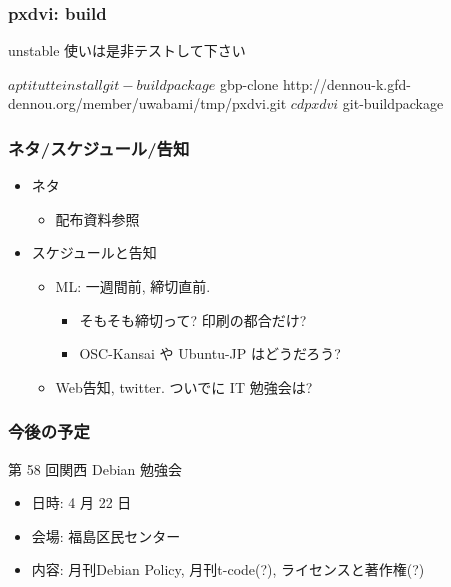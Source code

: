 \documentclass[cjk,dvipdfmx,12pt,%
hyperref={bookmarks=true,bookmarksnumbered=true,bookmarksopen=false,%
colorlinks=false,%
pdftitle={第 57 回 関西 Debian 勉強会},%
pdfauthor={倉敷・のがた・河田・佐々木},%
pdfsubject={資料},%
}]{beamer}
\begin{document}

\begin{frame}[fragile]
\frametitle{pxdvi: build}

unstable 使いは是非テストして下さい

\begin{commandline}
  $ aptitutte install git-buildpackage
  $ gbp-clone http://dennou-k.gfd-dennou.org/member/uwabami/tmp/pxdvi.git
  $ cd pxdvi
  $ git-buildpackage
\end{commandline}
\end{frame}


\begin{frame}[fragile]
  \frametitle{ネタ/スケジュール/告知}
  \begin{itemize}
  \item ネタ
    \begin{itemize}
    \item 配布資料参照
    \end{itemize}
  \item スケジュールと告知
    \begin{itemize}
    \item ML: 一週間前, 締切直前.
      \begin{itemize}
      \item そもそも締切って? 印刷の都合だけ?
      \item OSC-Kansai や Ubuntu-JP はどうだろう?
      \end{itemize}
    \item Web告知, twitter. ついでに IT 勉強会は?
    \end{itemize}
  \end{itemize}
\end{frame}


\begin{frame}[fragile]
\frametitle{今後の予定}


\begin{block}{第 58 回関西 Debian 勉強会}
\begin{itemize}
  \item 日時: 4 月 22 日
  \item 会場: 福島区民センター
  \item 内容: 月刊Debian Policy, 月刊t-code(?), ライセンスと著作権(?)
\end{itemize}
\end{block}


\end{frame}



\takahashi[50]{  }
\end{document}
